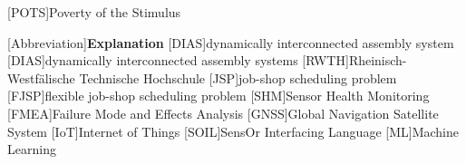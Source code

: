 \usepackage{acronym}

[POTS]{Poverty of the Stimulus}

\newcommand{\rd}[0]{{\ensuremath{^{\textrm{rd}}}}\xspace}

\begin{acronym}[Abbreviation]
    [Abbreviation]{\textbf{Explanation}}
    [DIAS]{dynamically interconnected assembly system}
    [DIAS]{dynamically interconnected assembly systems}
    [RWTH]{Rheinisch-Westfälische Technische Hochschule}
    [JSP]{job-shop scheduling problem}
    [FJSP]{flexible job-shop scheduling problem}
    [SHM]{Sensor Health Monitoring}
    [FMEA]{Failure Mode and Effects Analysis}
    [GNSS]{Global Navigation Satellite System}
    [IoT]{Internet of Things}
    [SOIL]{SensOr Interfacing Language}
        [ML]{Machine Learning}
\end{acronym}
